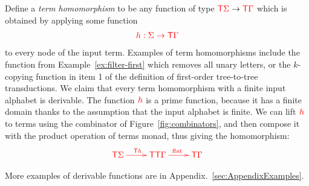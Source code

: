 

 
\noindent\begin{example}\label{ex:filter} 
   Define a \emph{term homomorphism}  to be any function of type ${\color{red}{\mathsf T}} {\color{red}{\Sigma}} \to {\color{red}{\mathsf T}} {\color{red}{\Gamma}}$ which is obtained by applying some function
   \begin{align*}
   {\color{red}{h : {\color{red}{\Sigma}}\to {\color{red}{\mathsf T}}{\color{red}{\Gamma}}}}
   \end{align*}
   to every node of the input term. Examples of term homomorphisms include the function from Example~\ref{ex:filter-first} which removes all unary letters, or the $k$-copying function in item 1 of the definition of first-order tree-to-tree transductions.  We claim that every term homomorphism with a finite input alphabet is derivable. The function ${\color{red}{h}}$ is a prime function, because it has a finite domain thanks to the assumption that the input alphabet is finite. We can lift ${\color{red}{h}}$ to terms using the combinator of Figure~\ref{fig:combinators}, and then compose it with the product operation of terms monad, thus giving the homomorphism:
   \begin{align*}
   \ranked{\xymatrix{
\tmonad \rSigma \ar[r]^{\tmonad h} &
\tmonad \tmonad \rGamma \ar[r]^{\flatt} &
\tmonad \rGamma
   }}
   \end{align*} 
\end{example}

More examples of derivable functions are in Appendix.~\ref{sec:AppendixExamples}.